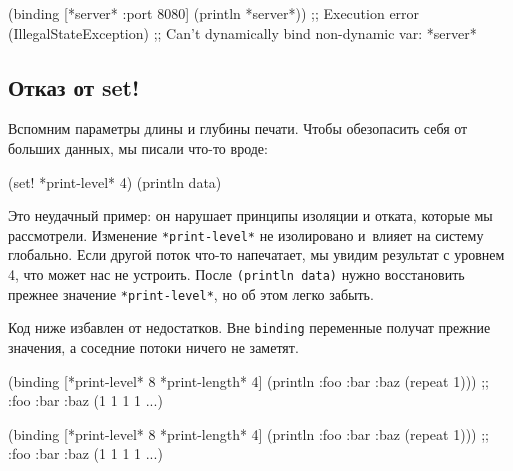 \else

\begin{english}
  \begin{clojure}
(binding [*server* {:port 8080}]
  (println *server*))
;; Execution error (IllegalStateException)
;; Can't dynamically bind non-dynamic var: *server*
  \end{clojure}
\end{english}

\fi

\subsection{Отказ от set!}

Вспомним параметры длины и глубины печати. Чтобы обезопасить себя от больших
данных, мы писали что-то вроде:

\begin{english}
  \begin{clojure}
(set! *print-level* 4)
(println data)
  \end{clojure}
\end{english}


Это неудачный пример: он нарушает принципы изоляции и отката, которые мы
рассмотрели. Изменение \verb|*print-level*| не изолировано и~влияет на систему
глобально. Если другой поток что-то напечатает, мы увидим результат с уровнем 4,
что может нас не устроить. После \verb|(println data)| нужно восстановить
прежнее значение \verb|*print-level*|, но об этом легко забыть.

Код ниже избавлен от недостатков. Вне \verb|binding| переменные получат
прежние значения, а соседние потоки ничего не заметят.

\ifx\DEVICETYPE\MOBILE

\begin{english}
  \begin{clojure}
(binding [*print-level* 8
          *print-length* 4]
  (println
    {:foo {:bar {:baz (repeat 1)}}}))
;; {:foo {:bar {:baz (1 1 1 1 ...)}}}
  \end{clojure}
\end{english}

\else

\begin{english}
  \begin{clojure}
(binding [*print-level* 8
          *print-length* 4]
  (println {:foo {:bar {:baz (repeat 1)}}}))
;; {:foo {:bar {:baz (1 1 1 1 ...)}}}
  \end{clojure}
\end{english}

